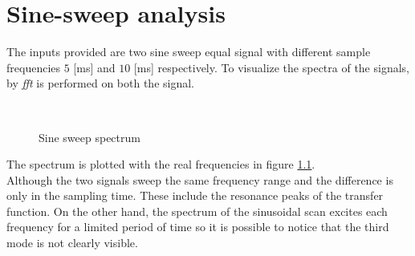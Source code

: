 \chapter{Sine-sweep analysis}
\label{chap:sinesweep}
The inputs provided are two sine sweep equal signal with different sample
frequencies \(5\) [\si{\milli\second}] and \(10\) [\si{\milli\second}] 
respectively.
To visualize the spectra of the signals, by \emph{fft} is performed on both the
signal.
\begin{figure}[htb]
	\centering
		\,
	\caption{Sine sweep spectrum}
	\label{fig:spectral}
\end{figure}
%
The spectrum is plotted with the real frequencies in figure \ref{fig:spectral}.\\
Although the two signals sweep the same frequency range and the difference is
only in the sampling time. These include the resonance peaks of the transfer
function.
On the other hand, the spectrum of the sinusoidal scan excites each frequency
for a limited period of time so it is possible to notice that the third mode is
not clearly visible.
%
